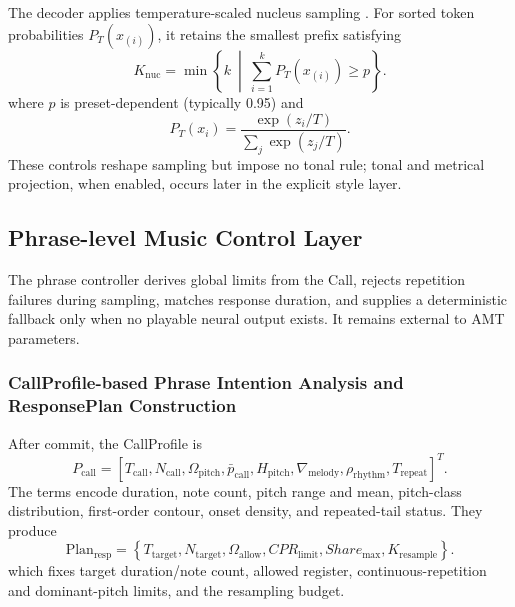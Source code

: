 \documentclass[11pt,a4paper]{article}
\begin{document}
The decoder applies temperature-scaled nucleus sampling \citep{holtzman2020curious}. For sorted token probabilities $P_T(x_{(i)})$, it retains the smallest prefix satisfying
\begin{equation}
K_{\mathrm{nuc}} =
\min \left\{
k
\ \middle|\
\sum_{i=1}^{k} P_T(x_{(i)}) \geq p
\right\}.
\label{eq:nucleus-k}
\end{equation}
where $p$ is preset-dependent (typically 0.95) and
\begin{equation}
P_T(x_i)
=
\frac{\exp(z_i/T)}
{\sum_j \exp(z_j/T)}.
\label{eq:temperature-scaling}
\end{equation}
These controls reshape sampling but impose no tonal rule; tonal and metrical projection, when enabled, occurs later in the explicit style layer.
\subsection{Phrase-level Music Control Layer}
\label{sec:phrase-level-control}

The phrase controller derives global limits from the Call, rejects repetition failures during sampling, matches response duration, and supplies a deterministic fallback only when no playable neural output exists. It remains external to AMT parameters.

\subsubsection{CallProfile-based Phrase Intention Analysis and ResponsePlan Construction}
\label{sec:callprofile-responseplan}

After commit, the CallProfile is
\begin{equation}
P_{\mathrm{call}}
=
\left[
T_{\mathrm{call}},
N_{\mathrm{call}},
\Omega_{\mathrm{pitch}},
\bar{p}_{\mathrm{call}},
H_{\mathrm{pitch}},
\nabla_{\mathrm{melody}},
\rho_{\mathrm{rhythm}},
T_{\mathrm{repeat}}
\right]^T.
\label{eq:callprofile-vector}
\end{equation}
The terms encode duration, note count, pitch range and mean, pitch-class distribution, first-order contour, onset density, and repeated-tail status. They produce
\begin{equation}
\mathrm{Plan}_{\mathrm{resp}}
=
\left\{
T_{\mathrm{target}},
N_{\mathrm{target}},
\Omega_{\mathrm{allow}},
CPR_{\mathrm{limit}},
Share_{\max},
K_{\mathrm{resample}}
\right\}.
\label{eq:responseplan}
\end{equation}
which fixes target duration/note count, allowed register, continuous-repetition and dominant-pitch limits, and the resampling budget.
\end{document}
